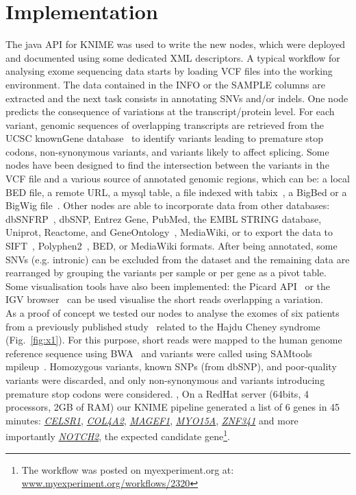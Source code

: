\documentclass{bioinfo}
\begin{document}
\section{Implementation}

The java API for KNIME was used to write the new nodes, which were deployed and documented using some dedicated XML descriptors.
A typical workflow for analysing exome sequencing data starts by loading VCF files into the working environment. The data contained in the INFO or the SAMPLE columns are extracted and the next task consists in annotating SNVs and/or indels. One node predicts the consequence of variations at the transcript/protein level. For each variant, genomic sequences of overlapping transcripts are retrieved from the UCSC knownGene database~\citep{pmid16500937} to identify variants leading to premature stop codons, non-synonymous variants, and variants likely to affect splicing.  Some nodes have been designed to find the intersection between the variants in the VCF file and a various source of annotated genomic regions, which can be: a local BED file, a remote URL, a mysql table, a file indexed with tabix~\citep{pmid21208982}, a BigBed or a BigWig file~\citep{pmid20639541}. Other nodes are able to incorporate data from other databases: dbSNFRP~\citep{pmid21520341}, dbSNP, Entrez Gene, PubMed, the EMBL STRING database, Uniprot, Reactome, and GeneOntology~\citep{pmid17098935}, MediaWiki, or to export the data to SIFT~\citep{pmid11337480}, Polyphen2~\citep{pmid20354512}, BED, or MediaWiki formats. After being annotated, some SNVs (e.g. intronic) can be excluded from the dataset and the remaining data are rearranged by grouping the variants per sample or per gene as a pivot table. Some visualisation tools have also been implemented: the Picard API~\citep{pmid19505943} or the IGV browser~\citep{pmid21221095} can be used visualise the short reads overlapping a variation.
\\
As a proof of concept we tested our nodes to analyse the exomes of six patients from a previously published study~\citep{pmid21378989} related to the Hajdu Cheney syndrome (Fig.~\ref{fig:x1}). For this purpose, short reads were mapped to the human genome reference sequence using BWA~\citep{pmid20080505} and variants were called using SAMtools mpileup~\citep{pmid19505943}. Homozygous variants, known SNPs (from dbSNP), and poor-quality variants were discarded, and only non-synonymous and variants introducing premature stop codons were considered. , On a RedHat server (64bits, 4 processors, 2GB of RAM) our KNIME pipeline generated a list of 6 genes in 45 minutes: \href{http://www.ncbi.nlm.nih.gov/gene/9620}{\textit{CELSR1}},  \href{http://www.ncbi.nlm.nih.gov/gene/1284}{\textit{COL4A2}}, \href{http://www.ncbi.nlm.nih.gov/gene/64110}{\textit{MAGEF1}}, \href{http://www.ncbi.nlm.nih.gov/gene/51168}{\textit{MYO15A}}, \href{http://www.ncbi.nlm.nih.gov/gene/84905}{\textit{ZNF341}} and more importantly \href{http://www.ncbi.nlm.nih.gov/gene/4853}{\textit{NOTCH2}}, the expected candidate gene\footnote{The workflow was posted on myexperiment.org at: \href{http://www.myexperiment.org/workflows/2320.html}{www.myexperiment.org/workflows/2320}}.
\end{document}
